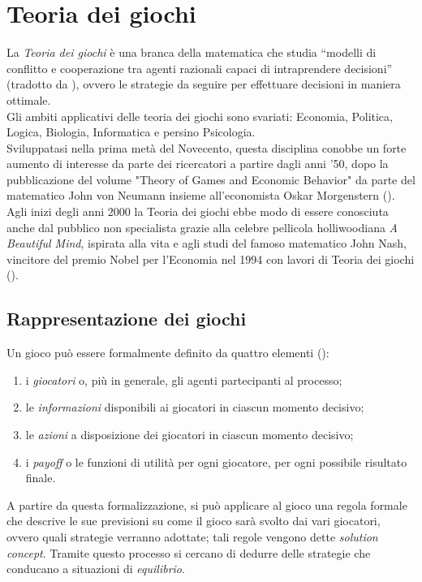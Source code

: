 \section{Teoria dei giochi}

La \emph{Teoria dei giochi} è una branca della matematica che studia ``modelli di conflitto e cooperazione tra agenti razionali capaci di intraprendere decisioni'' (tradotto da \cite{gtheory}), ovvero le strategie da seguire per effettuare decisioni in maniera ottimale.\\
Gli ambiti applicativi delle teoria dei giochi sono svariati: Economia, Politica, Logica, Biologia, Informatica e persino Psicologia.\\
Sviluppatasi nella prima metà del Novecento, questa disciplina conobbe un forte aumento di interesse da parte dei ricercatori a partire dagli anni '50, dopo la pubblicazione del volume "Theory of Games and Economic Behavior" da parte del matematico John von Neumann insieme all'economista Oskar Morgenstern (\cite{tog}). Agli inizi degli anni 2000 la Teoria dei giochi ebbe modo di essere conosciuta anche dal pubblico non specialista grazie alla celebre pellicola holliwoodiana \emph{A Beautiful Mind}, ispirata alla vita e agli studi del famoso matematico John Nash, vincitore del premio Nobel per l'Economia nel 1994 con lavori di Teoria dei giochi (\cite{jnash}).


\subsection{Rappresentazione dei giochi}

Un gioco può essere formalmente definito da quattro elementi (\cite{ramusen}):
\begin{enumerate}
   \item i \emph{giocatori} o, più in generale, gli agenti partecipanti al processo;
   \item le \emph{informazioni} disponibili ai giocatori in ciascun momento decisivo;
   \item le \emph{azioni} a disposizione dei giocatori in ciascun momento decisivo;
   \item i \emph{payoff} o le funzioni di utilità per ogni giocatore, per ogni possibile risultato finale.   
\end{enumerate}
A partire da questa formalizzazione, si  può applicare al gioco una regola formale che descrive le sue previsioni su come il gioco sarà svolto dai vari giocatori, ovvero quali strategie verranno adottate; tali regole vengono dette \emph{solution concept}. Tramite questo processo si cercano di dedurre delle strategie che conducano a situazioni di \emph{equilibrio}.



